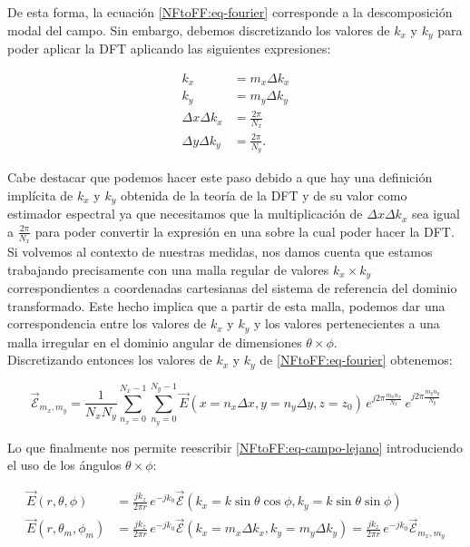 \newpage

\noindent
De esta forma, la ecuación \eqref{NFtoFF:eq-fourier} corresponde a la descomposición modal del campo. Sin embargo, debemos discretizando los valores de $k_{x}$ y $k_{y}$ para poder aplicar la DFT aplicando las siguientes expresiones: 

\begin{subequations}
\begin{align}
k_{x}&= m_{x}\Delta k_{x}
\\
k_{y}&= m_{y}\Delta k_{y}
\\
\Delta x \Delta k_{x}&=\frac{2\pi}{N_{x}}
\\
\Delta y \Delta k_{y}&=\frac{2\pi}{N_{y}}.
\end{align}
\end{subequations}

Cabe destacar que podemos hacer este paso debido a que hay una definición implícita de $k_{x}$ y $k_{y}$ obtenida de la teoría de la DFT y de su valor como estimador espectral ya que necesitamos que la multiplicación de $\Delta x \Delta k_{x}$ sea igual a $\frac{2\pi}{N_{x}}$ para poder convertir la expresión en una sobre la cual poder hacer la DFT.\\

Si volvemos al contexto de nuestras medidas, nos damos cuenta que estamos trabajando precisamente con una malla regular de valores $k_{x}\times k_{y}$ correspondientes a coordenadas cartesianas del sistema de referencia del dominio transformado. Este hecho implica que a partir de esta malla, podemos dar una correspondencia entre los valores de $k_{x}$ y $k_{y}$ y los valores pertenecientes a una malla irregular en el dominio angular de dimensiones $\theta \times \phi$.\\

Discretizando entonces los valores de $k_{x}$ y $k_{y}$ de \eqref{NFtoFF:eq-fourier} obtenemos: 

\begin{equation}
{\vec{\mathcal{E}}}_{m_{x},m_{y}}=\frac{1}{N_{x} N_{y}}
\sum_{n_{x}=0}^{N_{x}-1}\sum_{n_{y}=0}^{N_{y}-1}
\vec{E}(x=n_{x}\Delta x,y=n_{y} \Delta y,z=z_{0}) \,e^{j 2\pi
\frac{m_{x} n_{x}}{N_{x}}}\,e^{j 2\pi \frac{m_{y} n_{y}}{N_{y}}}
\label{eq-fft1}
\end{equation}

Lo que finalmente nos permite reescribir \eqref{NFtoFF:eq-campo-lejano} introduciendo el uso de los ángulos $\theta \times \phi$:

\begin{align}
\vec{E}(r,\theta,\phi)&=\frac{jk_{z}}{2\pi r}\,e^{-jk_{0}}{{\vec{\mathcal{E}}}}(k_{x}=k \sin\theta \cos\phi,k_{y}= k\sin\theta \sin\phi)\nonumber
\\
\vec{E}(r,\theta_{m},\phi_{m})&=\frac{jk_{z}}{2\pi r}\,e^{-jk_{0}}{{\vec{\mathcal{E}}}}(k_{x}=m_{x}\Delta k_{x},k_{y}= m_{y}\Delta k_{y})=\frac{jk_{z}}{2\pi r}\,e^{-jk_{0}}{{\vec{\mathcal{E}}}}_{m_{x},m_{y}}\nonumber
\\
\label{eq-fourier3}
\end{align}

